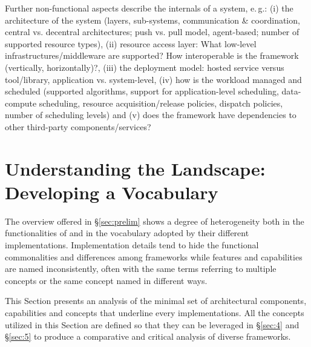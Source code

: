\documentclass{sig-alternate}
\begin{document}
Further non-functional aspects describe the internals of a \pilotjob system,
e.\,g.: (i) the architecture of the system (layers, sub-systems,
communication \& coordination, central vs. decentral architectures; push vs.
pull model, agent-based; number of supported resource types), (ii) resource
access layer: What low-level infrastructures/middleware are supported? How
interoperable is the framework (vertically, horizontally)?, (iii) the
deployment model: hosted service versus tool/library, application vs.
system-level, (iv) how is the workload managed and scheduled (supported
algorithms, support for application-level scheduling, data-compute scheduling,
resource acquisition/release policies, dispatch policies, number of scheduling
levels) and (v) does the framework have dependencies to other third-party
components/services?



\section{Understanding the Landscape: Developing a Vocabulary}
\label{sec:vocab}

The overview offered in \S\ref{sec:prelim} shows a degree of heterogeneity
both in the functionalities of \pilotjobs and in the vocabulary adopted by
their different implementations. Implementation details tend to hide the
functional commonalities and differences among \pilotjobs frameworks while
features and capabilities are named inconsistently, often with the same terms
referring to multiple concepts or the same concept named in different ways.

This Section presents an analysis of the minimal set of architectural
components, capabilities and concepts that underline every \pilotjob
implementations. All the concepts utilized in this Section are defined so that
they can be leveraged in \S\ref{sec:4} and \S\ref{sec:5} to produce a
comparative and critical analysis of diverse \pilotjobs frameworks.
\end{document}
